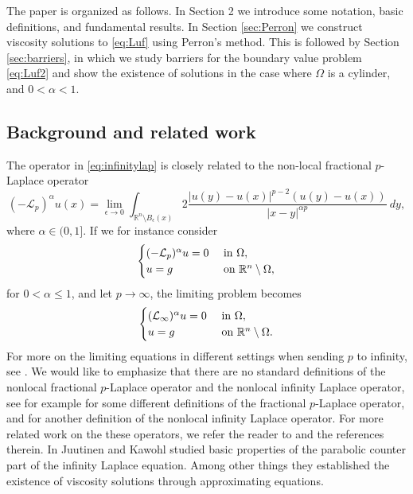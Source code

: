 \documentclass[11pt]{article}
\providecommand{\Linf}{\mathcal{L}_{\infty}}
\providecommand{\Rn}{\mathbb{R}^n}
\numberwithin{equation}{section}
\theoremstyle{definition}
\begin{document}
The paper is organized as follows. In Section 2 we introduce some notation, basic definitions, and fundamental results. In Section \ref{sec:Perron} we construct viscosity solutions to \eqref{eq:Luf} using Perron's method. This is followed by Section \ref{sec:barriers}, in which we study barriers for the boundary value problem \eqref{eq:Luf2} and show the existence of solutions in the case where $\Omega$ is a cylinder, and $0<\alpha<1$.
\subsection{Background and related work}
The operator in \eqref{eq:infinitylap} is closely related to the non-local fractional $p$-Laplace operator
\begin{equation*}\label{eq:fraclap}
(-\mathcal{L}_p)^{\alpha} u(x) = \lim_{\epsilon \to 0} \int_{\Rn \setminus B_{\epsilon}(x)} 2\frac{|u(y)-u(x)|^{p-2}(u(y)-u(x))}{|x-y|^{\alpha p}} \ dy,
\end{equation*}
where $\alpha \in (0,1]$. If we for instance consider
\begin{align*}
     \begin{cases}
                (-\mathcal{L}_p)^{\alpha} u  = 0 & \textup{ in } \Omega, \\
                    u =g & \textup{ on } \Rn \setminus \Omega, 
     \end{cases}
\end{align*}
for $0 < \alpha \leq 1$, and let $p \to \infty$, the limiting problem becomes
\begin{align}\label{eq:Holderinf}
     \begin{cases}
                 (\Linf)^{\alpha} u = 0 & \textup{ in } \Omega, \\
                    u =g & \textup{ on } \Rn \setminus \Omega. 
     \end{cases}
\end{align}
For more on the limiting equations in different settings when sending $p$ to infinity, see \cite{CLM2012, FL2016, LL2012}. We would like to emphasize that there are no standard definitions of the nonlocal fractional $p$-Laplace operator and the nonlocal infinity Laplace operator, see for example \cite{BCF20122, CJ2017,  STD2018} for some different definitions of the fractional $p$-Laplace operator, and \cite{BCF2012} for another definition of the nonlocal infinity Laplace operator. For more related work on the these operators, we refer the reader to \cite{ CRY2010, CS2007, SR2019, L2006, L2016, PSSW2011} and the references therein. In \cite{JK2006} Juutinen and Kawohl studied basic properties of the parabolic counter part of the infinity Laplace equation. Among other things they established the existence of viscosity solutions through approximating equations.
\end{document}
